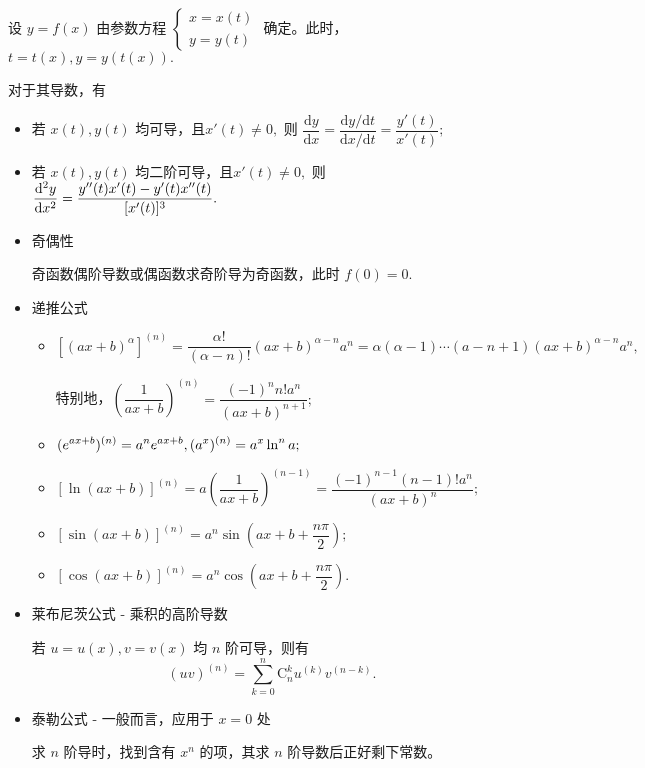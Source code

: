 
设 $ y = f(x) $ 由参数方程 $ \left\{\begin{matrix}
    x = x(t) \\ y = y(t)
\end{matrix}\right. $ 确定。此时，$ t = t(x),y = y(t(x)). $ 

对于其导数，有
\begin{itemize}
    \item 若 $ x(t),y(t) $ 均可导，且$ x'(t)\neq 0, $ 则 $ \dfrac{\mathrm{d}y}{\mathrm{d}x} = 
    \dfrac{\mathrm{d}y/\mathrm{d}t}{\mathrm{d}x/\mathrm{d}t} = \dfrac{y'(t)}{x'(t)}; $ 
    \item 若 $ x(t),y(t) $ 均二阶可导，且$ x'(t)\neq 0, $ 则 $ \dfrac{\mathrm{d}^2y}{\mathrm{d}x^2} = 
    \dfrac{y^{\prime\prime}(t)x'(t) - y'(t)x^{\prime\prime}(t)}{[x'(t)]^3}. $ 
\end{itemize}


\begin{itemize}
    \item 奇偶性
    
    奇函数偶阶导数或偶函数求奇阶导为奇函数，此时 $ f(0) = 0. $ 
    \item 递推公式
    
    \begin{itemize}[parsep = 6pt]
        \item $ [(ax+b)^\alpha]^{(n)} = \dfrac{\alpha !}{(\alpha - n)!}(ax+b)^{\alpha-n}a^n = 
        \alpha(\alpha - 1)\cdots(a-n+1)(ax+b)^{\alpha-n}a^n, $ 
        
        特别地，$ \left(\dfrac{1}{ax+b}\right)^{(n)} = \dfrac{(-1)^nn!a^n}{(ax+b)^{n+1}}; $ 
        \item $ \displaystyle (e^{ax+b})^{(n)} = a^ne^{ax+b},(a^x)^{(n)} = a^x\ln^n a;$ 
        \item $ [\ln(ax+b)]^{(n)} = a\left(\dfrac{1}{ax+b}\right)^{(n-1)} = \dfrac{(-1)^{n-1}(n-1)!a^n}{(ax+b)^n}; $ 
        \item $ [\sin(ax+b)]^{(n)} = a^n\sin(ax+b+\dfrac{n\pi}{2});$
        \item $ [\cos(ax+b)]^{(n)} = a^n\cos(ax+b+\dfrac{n\pi}{2}). $ 
    \end{itemize}
    \item 莱布尼茨公式 - 乘积的高阶导数
    
    若 $ u = u(x),v = v(x) $ 均 $ n $ 阶可导，则有$$
        (uv)^{(n)} = \sum_{k=0}^n\mathrm{C}_n^k u^{(k)} v^{(n-k)}.
    $$ 
    \item 泰勒公式 - 一般而言，应用于 $ x = 0 $ 处
    
    求 $ n $ 阶导时，找到含有 $ x^n $ 的项，其求 $ n $ 阶导数后正好剩下常数。
\end{itemize}

